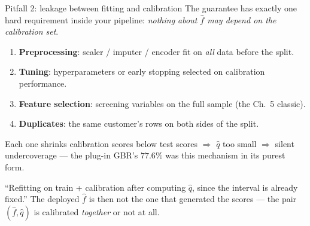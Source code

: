 \documentclass[aspectratio=169,11pt]{beamer}
\begin{document}
\begin{frame}{Pitfall 2: leakage between fitting and calibration}
  The guarantee has exactly one hard requirement inside your pipeline:
  \emph{nothing about $\hat f$ may depend on the calibration set}.
  \begin{readme}
    \begin{enumerate}
      \item \textbf{Preprocessing}: scaler / imputer / encoder fit on \emph{all} data
            before the split.
      \item \textbf{Tuning}: hyperparameters or early stopping selected on calibration
            performance.
      \item \textbf{Feature selection}: screening variables on the full sample
            (the Ch.\ 5 classic).
      \item \textbf{Duplicates}: the same customer's rows on both sides of the split.
    \end{enumerate}
    Each one shrinks calibration scores below test scores $\Rightarrow$ $\hat q$ too
    small $\Rightarrow$ silent undercoverage --- the plug-in GBR's $77.6\%$ was this
    mechanism in its purest form.
  \end{readme}
  \begin{mistake}
    ``Refitting on train + calibration after computing $\hat q$, since the interval is
    already fixed.'' The deployed $\hat f$ is then not the one that generated the
    scores --- the pair $(\hat f, \hat q)$ is calibrated \emph{together} or not at all.
  \end{mistake}
\end{frame}
\end{document}
